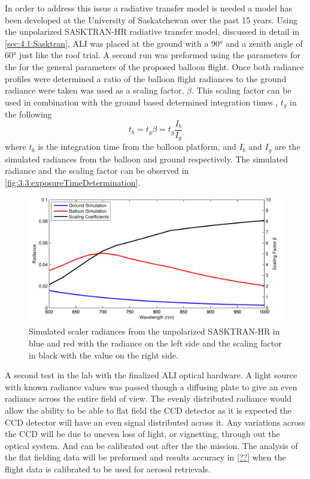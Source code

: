 In order to address this issue a radiative transfer model is needed a model has been developed at the University of Saskatchewan over the past 15 years. Using the unpolarized SASKTRAN-HR radiative transfer model, discussed in detail in \autoref{sec:4.1:Sasktran}, ALI was placed at the ground with a 90\si{\degree} and a zenith angle of 60\si{\degree} just like the roof trial. A second run was preformed using the parameters for the for the general parameters of the proposed balloon flight. Once both radiance profiles were determined a ratio of the balloon flight radiances to the ground radiance were taken was used as a scaling factor, $\beta$. This scaling factor can be used in combination with the ground based determined integration times , $t_{g}$  in the following
\begin{equation}
    t_{b} = t_{g}\beta = t_{g}\frac{I_{b}}{I_{g}}
\end{equation}
where $t_{b}$ is the integration time from the balloon platform, and $I_{b}$ and $I_{g}$ are the simulated radiances from the balloon and ground respectively. The simulated radiance and the scaling factor can be observed in \autoref{fig:3.3:exposureTimeDetermination}. 

\begin{figure}
        \centering
        \includegraphics[width=1.0\textwidth]{./Images/3-3-ExposureTimeDetermination.pdf}
        \caption[Flight Exposure Time Determination]{Simulated scaler radiances from the unpolarized SASKTRAN-HR in blue and red with the radiance on the left side and the scaling factor in black with the value on the right side.}
        \label{fig:3.3:exposureTimeDetermination}
\end{figure}

A second test in the lab with the finalized ALI optical hardware. A light source with known radiance values was passed though a diffusing plate to give an even radiance across the entire field of view. The evenly distributed radiance would allow the ability to be able to flat field the CCD detector as it is expected the CCD detector will have an even signal distributed across it. Any variations across the CCD will be due to uneven loss of light, or vignetting, through out the optical system. And can be calibrated out after the the mission. The analysis of the flat fielding data will be preformed and results accuracy in \autoref{??} when the flight data is calibrated to be used for aerosol retrievals.

